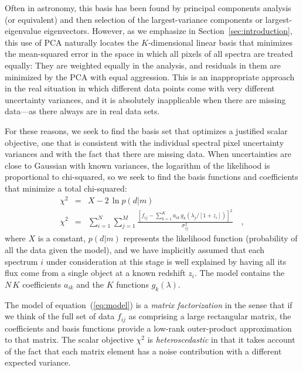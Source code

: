 \documentclass[12pt,preprint]{aastex}
\newcommand{\sectionname}{Section}
\newcommand{\equationname}{equation}
\begin{document}
Often in astronomy, this basis has been found by principal components
analysis (or equivalent) and then selection of the largest-variance
components or largest-eigenvalue eigenvectors.  However, as we
emphasize in \sectionname~\ref{sec:introduction}, this use of PCA
naturally locates the $K$-dimensional linear basis that minimizes the
mean-squared error in the space in which all pixels of all spectra are
treated equally: They are weighted equally in the analysis, and
residuals in them are minimized by the PCA with equal aggression. This
is an inappropriate approach in the real situation in which different
data points come with very different uncertainty variances, and it is
absolutely inapplicable when there are missing data---as there always
are in real data sets.

For these reasons, we seek to find the basis set that optimizes a
justified scalar objective, one that is consistent with the individual
spectral pixel uncertainty variances and with the fact that there are
missing data.  When uncertainties are close to Gaussian with known
variances, the logarithm of the likelihood is proportional to
chi-squared, so we seek to find the basis functions and coefficients
that minimize a total chi-squared:
\begin{eqnarray}\label{eq:chi-squared}\displaystyle
\chi^2 & = & X - 2\,\ln p(d|m) \nonumber\\
\chi^2 & = & \sum_{i=1}^N \sum_{j=1}^M
             \frac{\left[f_{ij}-\sum_{k=1}^K a_{ik}
                      \,g_k(\lambda_j/[1+z_i])\right]^2}
{\sigma^2_{ij}}
\quad ,
\end{eqnarray}
where $X$ is a constant, $p(d|m)$ represents the likelihood function
(probability of all the data given the model), and we have implicitly
assumed that each spectrum $i$ under consideration at this stage is
well explained by having all its flux come from a single object at a
known redshift $z_i$. The model contains the $N\,K$ coefficients
$a_{ik}$ and the $K$ functions $g_k(\lambda)$.

The model of \equationname~(\ref{eq:model}) is a \emph{matrix
  factorization} in the sense that if we think of the full set of data
$f_{ij}$ as comprising a large rectangular matrix, the coefficients
and basis functions provide a low-rank outer-product approximation to
that matrix.  The scalar objective $\chi^2$ is \emph{heteroscedastic}
in that it takes account of the fact that each matrix element has a
noise contribution with a different expected variance.
\end{document}
